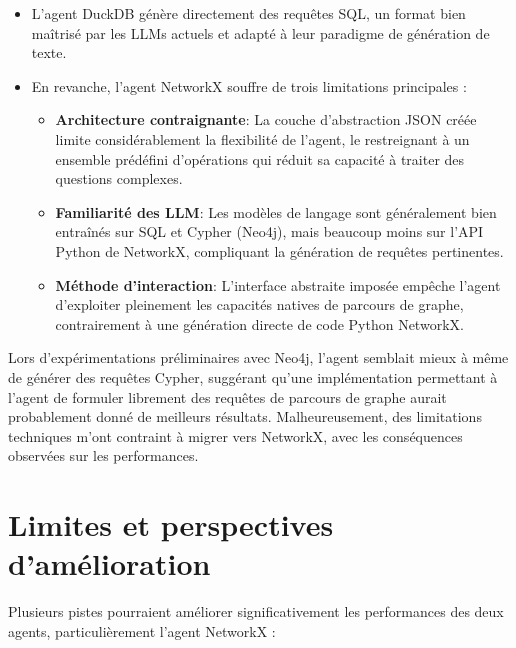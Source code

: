 \documentclass[a4paper,11pt]{article}
\begin{document}
\begin{itemize}
    \item L'agent DuckDB génère directement des requêtes SQL, un format bien maîtrisé par les LLMs actuels et adapté à leur paradigme de génération de texte.
    
    \item En revanche, l'agent NetworkX souffre de trois limitations principales :
    
    \begin{itemize}
        \item \textbf{Architecture contraignante}: La couche d'abstraction JSON créée limite considérablement la flexibilité de l'agent, le restreignant à un ensemble prédéfini d'opérations qui réduit sa capacité à traiter des questions complexes.
        
        \item \textbf{Familiarité des LLM}: Les modèles de langage sont généralement bien entraînés sur SQL et Cypher (Neo4j), mais beaucoup moins sur l'API Python de NetworkX, compliquant la génération de requêtes pertinentes.
        
        \item \textbf{Méthode d'interaction}: L'interface abstraite imposée empêche l'agent d'exploiter pleinement les capacités natives de parcours de graphe, contrairement à une génération directe de code Python NetworkX.
    \end{itemize}
\end{itemize}

Lors d'expérimentations préliminaires avec Neo4j, l'agent semblait mieux à même de générer des requêtes Cypher, suggérant qu'une implémentation permettant à l'agent de formuler librement des requêtes de parcours de graphe aurait probablement donné de meilleurs résultats. Malheureusement, des limitations techniques m'ont contraint à migrer vers NetworkX, avec les conséquences observées sur les performances.



\section{Limites et perspectives d'amélioration}
\label{sec:limites}

Plusieurs pistes pourraient améliorer significativement les performances des deux agents, particulièrement l'agent NetworkX :
\end{document}
